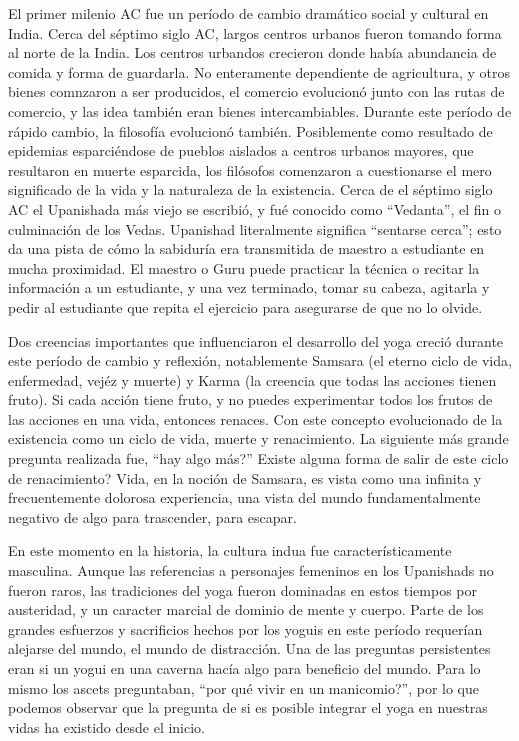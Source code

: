 El primer milenio AC fue un período de cambio dramático social y cultural en India. Cerca del s\'eptimo siglo AC, largos centros urbanos fueron tomando forma al norte de la India. Los centros urbandos crecieron donde había abundancia de comida y forma de guardarla. No enteramente dependiente de agricultura, y otros bienes comnzaron a ser producidos, el comercio evolucionó junto con las rutas de comercio, y las idea tambi\'en eran bienes intercambiables. Durante este período de rápido cambio, la filosofía evolucionó tambi\'en. Posiblemente como resultado de epidemias esparci\'endose de pueblos aislados a centros urbanos mayores, que resultaron en muerte esparcida, los filósofos comenzaron a cuestionarse el mero significado de la vida y la naturaleza de la existencia. Cerca de el s\'eptimo siglo AC el Upanishada más viejo se escribió, y fu\'e conocido como ``Vedanta'', el fin o culminación de los Vedas. Upanishad literalmente significa ``sentarse cerca''; esto da una pista de cómo la sabiduría era transmitida de maestro a estudiante en mucha proximidad. El maestro o Guru puede practicar la t\'ecnica o recitar la información a un estudiante, y una vez terminado, tomar su cabeza, agitarla y pedir al estudiante que repita el ejercicio para asegurarse de que no lo olvide.

Dos creencias importantes que influenciaron el desarrollo del yoga creció durante este período de cambio y reflexión, notablemente Samsara (el eterno ciclo de vida, enfermedad, vej\'ez y muerte) y Karma (la creencia que todas las acciones tienen fruto). Si cada acción tiene fruto, y no puedes experimentar todos los frutos de las acciones en una vida, entonces renaces. Con este concepto evolucionado de la existencia como un ciclo de vida, muerte y renacimiento. La siguiente más grande pregunta realizada fue, ``hay algo más?'' Existe alguna forma de salir de este ciclo de renacimiento? Vida, en la noción de Samsara, es vista como una infinita y frecuentemente dolorosa experiencia, una vista del mundo fundamentalmente negativo de algo para trascender, para escapar.

En este momento en la historia, la cultura indua fue característicamente masculina. Aunque las referencias a personajes femeninos en los Upanishads no fueron raros, las tradiciones del yoga fueron dominadas en estos tiempos por austeridad, y un caracter marcial de dominio de mente y cuerpo. Parte de los grandes esfuerzos y sacrificios hechos por los yoguis en este período requerían alejarse del mundo, el mundo de distracción. Una de las preguntas persistentes eran si un yogui en una caverna hacía algo para beneficio del mundo. Para lo mismo los ascets preguntaban, ``por qu\'e vivir en un manicomio?'', por lo que podemos observar que la pregunta de si es posible integrar el yoga en nuestras vidas ha existido desde el inicio.

